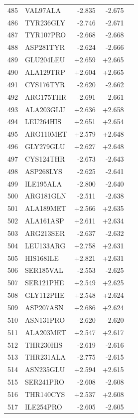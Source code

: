 \begin{longtable}{r l r r c}
485 & VAL97ALA & -2.835 & -2.675 &  \\
486 & TYR236GLY & -2.746 & -2.671 &  \\
487 & TYR107PRO & -2.668 & -2.668 &  \\
488 & ASP281TYR & -2.624 & -2.666 &  \\
489 & GLU204LEU & +2.659 & +2.665 &  \\
490 & ALA129TRP & +2.604 & +2.665 &  \\
491 & CYS176TYR & -2.620 & -2.662 &  \\
492 & ARG175THR & -2.691 & -2.661 &  \\
493 & ALA203GLU & +2.636 & +2.658 &  \\
494 & LEU264HIS & +2.651 & +2.654 &  \\
495 & ARG110MET & +2.579 & +2.648 &  \\
496 & GLY279GLU & +2.627 & +2.648 &  \\
497 & CYS124THR & -2.673 & -2.643 &  \\
498 & ASP268LYS & -2.625 & -2.641 &  \\
499 & ILE195ALA & -2.800 & -2.640 &  \\
500 & ARG181GLN & -2.511 & -2.638 &  \\
501 & ALA189MET & +2.566 & +2.635 &  \\
502 & ALA161ASP & +2.611 & +2.634 &  \\
503 & ARG213SER & -2.637 & -2.632 &  \\
504 & LEU133ARG & +2.758 & +2.631 &  \\
505 & HIS168ILE & +2.821 & +2.631 &  \\
506 & SER185VAL & -2.553 & -2.625 &  \\
507 & SER121PHE & +2.549 & +2.625 &  \\
508 & GLY112PHE & +2.548 & +2.624 &  \\
509 & ASP207ASN & +2.686 & +2.624 &  \\
510 & ASN131PRO & -2.620 & -2.620 &  \\
511 & ALA203MET & +2.547 & +2.617 &  \\
512 & THR230HIS & -2.619 & -2.616 &  \\
513 & THR231ALA & -2.775 & -2.615 &  \\
514 & ASN235GLU & +2.594 & +2.615 &  \\
515 & SER241PRO & -2.608 & -2.608 &  \\
516 & THR140CYS & +2.537 & +2.608 &  \\
517 & ILE254PRO & -2.605 & -2.605 &  \\

\end{longtable}
